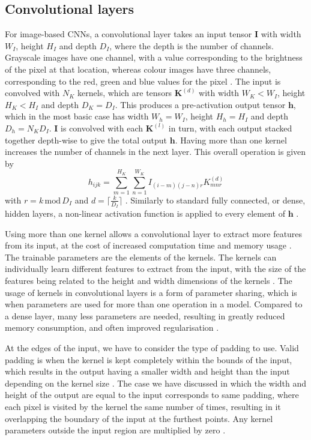 \documentclass[12pt]{article}
\begin{document}
\subsection{Convolutional layers}
For image-based CNNs, a convolutional layer takes an input tensor $\bm{I}$ with width $W_I$, height $H_I$ and depth $D_I$, where the depth is the number of channels. Grayscale images have one channel, with a value corresponding to the brightness of the pixel at that location, whereas colour images have three channels, corresponding to the red, green and blue values for the pixel \cite{Aghdam17, Goodfellow16}. The input is convolved with $N_K$ kernels, which are tensors $\bm{K}^{(d)}$ with width $W_K<W_I$, height $H_K<H_I$ and depth $D_K=D_I$. This produces a pre-activation output tensor $\bm{\bm{h}}$, which in the most basic case has width $W_h=W_I$, height $H_h=H_I$ and depth $D_h=N_KD_I$. $\bm{I}$ is convolved with each $\bm{K}^{(l)}$ in turn, with each output stacked together depth-wise to give the total output $\bm{h}$. Having more than one kernel increases the number of channels in the next layer. This overall operation is given by
\begin{equation}
h_{ijk}=\sum_{m=1}^{H_K}\sum_{n=1}^{W_K}I_{(i-m)(j-n)r}K_{mnr}^{(d)}
\end{equation}
with $r=k\,\mathrm{mod}\,D_I$ and $d=\lceil\frac{k}{D_I}\rceil$ \cite{Aghdam17, Goodfellow16}. Similarly to standard fully connected, or dense, hidden layers, a non-linear activation function is applied to every element of $\bm{h}$ \cite{Aghdam17, Goodfellow16}. 

Using more than one kernel allows a convolutional layer to extract more features from its input, at the cost of increased computation time and memory usage \cite{Goodfellow16}. The trainable parameters are the elements of the kernels. The kernels can individually learn different features to extract from the input, with the size of the features being related to the height and width dimensions of the kernels \cite{Aghdam17, Goodfellow16}. The usage of kernels in convolutional layers is a form of parameter sharing, which is when parameters are used for more than one operation in a model. Compared to a dense layer, many less parameters are needed, resulting in greatly reduced memory consumption, and often improved regularisation \cite{Aghdam17, Goodfellow16}. 

At the edges of the input, we have to consider the type of padding to use. Valid padding is when the kernel is kept completely within the bounds of the input, which results in the output having a smaller width and height than the input depending on the kernel size \cite{Aghdam17, Goodfellow16}. The case we have discussed in which the width and height of the output are equal to the input corresponds to same padding, where each pixel is visited by the kernel the same number of times, resulting in it overlapping the boundary of the input at the furthest points. Any kernel parameters outside the input region are multiplied by zero \cite{Aghdam17, Goodfellow16}.
\end{document}
